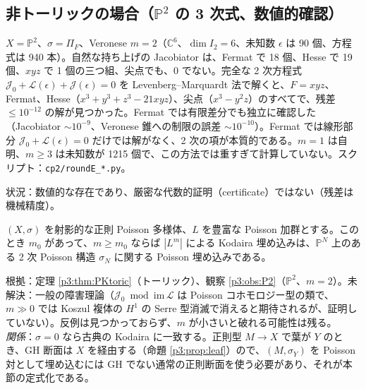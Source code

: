 \subsection{非トーリックの場合（$\mathbb P^2$ の 3 次式、数値的確認）}
\begin{obs}\tV\label{p3:obs:P2}
$X=\mathbb P^2$、$\sigma=\Pi_F$、Veronese $m=2$（$\mathbb C^6$、$\dim I_2=6$、未知数 $\epsilon$ は 90 個、方程式は 940 本）。自然な持ち上げの Jacobiator は、Fermat で 18 個、Hesse で 19 個、$xyz$ で 1 個の三つ組、尖点でも、0 でない。完全な 2 次方程式 $\mathcal J_0+\mathcal L(\epsilon)+\mathcal J(\epsilon)=0$ を Levenberg--Marquardt 法で解くと、$F=xyz$、Fermat、Hesse（$x^3+y^3+z^3-21xyz$）、尖点（$x^3-y^2z$）のすべてで、残差 $\le10^{-12}$ の解が見つかった。Fermat では有限差分でも独立に確認した（Jacobiator $\sim10^{-9}$、Veronese 錐への制限の誤差 $\sim10^{-10}$）。Fermat では線形部分 $\mathcal J_0+\mathcal L(\epsilon)=0$ だけでは解がなく、2 次の項が本質的である。$m=1$ は自明、$m\ge3$ は未知数が 1215 個で、この方法では重すぎて計算していない。スクリプト：\texttt{cp2/roundE\_*.py}。
\end{obs}
\noindent 状況：数値的な存在であり、厳密な代数的証明（certificate）ではない（残差は機械精度）。

\begin{conj}\tK\label{p3:conj:PK}
$(X,\sigma)$ を射影的な正則 Poisson 多様体、$L$ を豊富な Poisson 加群とする。このとき $m_0$ があって、$m\ge m_0$ ならば $|L^m|$ による Kodaira 埋め込みは、$\mathbb P^N$ 上のある 2 次 Poisson 構造 $\sigma_N$ に関する Poisson 埋め込みである。
\end{conj}
\noindent 根拠：定理 \ref{p3:thm:PKtoric}（トーリック）、観察 \ref{p3:obs:P2}（$\mathbb P^2$、$m=2$）。未解決：一般の障害理論（$\mathcal J_0\bmod\mathrm{im}\,\mathcal L$ は Poisson コホモロジー型の類で、$m\gg0$ では Koszul 複体の $H^1$ の Serre 型消滅で消えると期待されるが、証明していない）。反例は見つかっておらず、$m$ が小さいと破れる可能性は残る。\\
\emph{関係}：$\sigma=0$ なら古典の Kodaira に一致する。正則型 $M\to X$ で葉が $Y$ のとき、GH 断面は $X$ を経由する（命題 \ref{p3:prop:leaf}）ので、$(M,\sigma_Y)$ を Poisson 対として埋め込むには GH でない通常の正則断面を使う必要があり、それが本節の定式化である。

